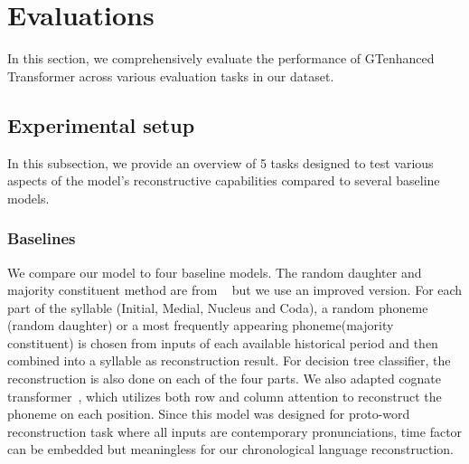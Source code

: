\section{Evaluations}\label{sec:evaluations}
In this section, we comprehensively evaluate the performance of GTenhanced Transformer across various evaluation tasks in our dataset.

\subsection{Experimental setup}
In this subsection, we provide an overview of 5 tasks designed to test various aspects of the model's reconstructive capabilities compared to several baseline models.

\subsubsection{Baselines}
We compare our model to four baseline models. The random daughter and majority constituent method are from ~\citet{chang_wikihan_2022} but we use an improved version. For each part of the syllable (Initial, Medial, Nucleus and Coda), a random phoneme (random daughter) or a most frequently appearing phoneme(majority constituent) is chosen from inputs of each available historical period and then combined into a syllable as reconstruction result. For decision tree classifier, the reconstruction is also done on each of the four parts. We also adapted cognate transformer~\cite{akavarapu_cognate_2023}, which utilizes both row and column attention to reconstruct the phoneme on each position. Since this model was designed for proto-word reconstruction task where all inputs are contemporary pronunciations, time factor can be embedded but meaningless for our chronological language reconstruction.

